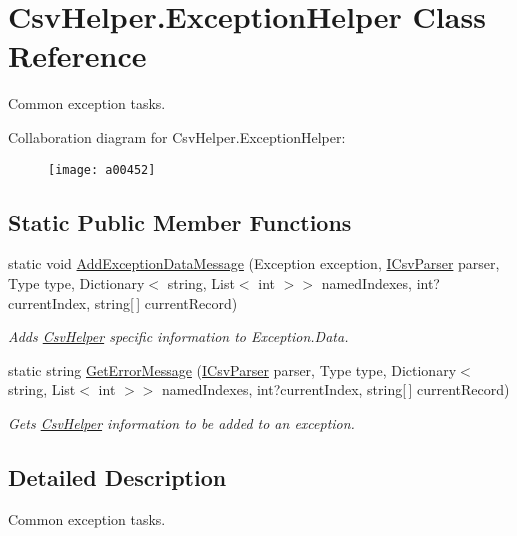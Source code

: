 \hypertarget{a00102}{\section{Csv\-Helper.\-Exception\-Helper Class Reference}
\label{a00102}
}


Common exception tasks.  




Collaboration diagram for Csv\-Helper.\-Exception\-Helper\-:
\nopagebreak
\begin{figure}[H]
\begin{center}
\leavevmode
\texttt{[image: a00452]}
\end{center}
\end{figure}
\subsection*{Static Public Member Functions}
\begin{DoxyCompactItemize}
\item 
static void \hyperlink{a00102_a7415ea84b6d462b9d61ecf2128282837}{Add\-Exception\-Data\-Message} (Exception exception, \hyperlink{a00113}{I\-Csv\-Parser} parser, Type type, Dictionary$<$ string, List$<$ int $>$$>$ named\-Indexes, int?current\-Index, string\mbox{[}$\,$\mbox{]} current\-Record)
\begin{DoxyCompactList}\small\item\em Adds \hyperlink{a00337}{Csv\-Helper} specific information to Exception.\-Data. \end{DoxyCompactList}\item 
static string \hyperlink{a00102_a11e421dc9f9fdb2b72d060a24471b5be}{Get\-Error\-Message} (\hyperlink{a00113}{I\-Csv\-Parser} parser, Type type, Dictionary$<$ string, List$<$ int $>$$>$ named\-Indexes, int?current\-Index, string\mbox{[}$\,$\mbox{]} current\-Record)
\begin{DoxyCompactList}\small\item\em Gets \hyperlink{a00337}{Csv\-Helper} information to be added to an exception. \end{DoxyCompactList}\end{DoxyCompactItemize}


\subsection{Detailed Description}
Common exception tasks. 



